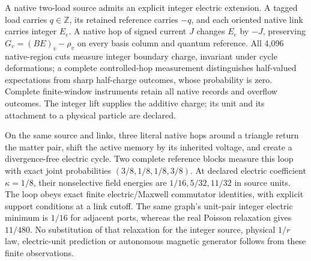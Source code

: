 A native two-load source admits an explicit integer electric extension.
A tagged load carries $q\in\mathbb Z$, its retained reference carries $-q$,
and each oriented native link carries integer $E_e$. A native hop of signed
current $J$ changes $E_e$ by $-J$, preserving
$G_v=(BE)_v-\rho_v$ on every basis column and quantum reference. All 4,096 native-region cuts measure integer boundary
charge, invariant under cycle deformations; a complete controlled-hop
measurement distinguishes half-valued expectations from sharp half-charge
outcomes, whose probability is zero. Complete
finite-window instruments retain all native records and overflow outcomes.
The integer lift supplies the additive charge; its unit and its attachment
to a physical particle are declared.

On the same source and links, three literal native hops around a triangle
return the matter pair, shift the active memory by its inherited voltage,
and create a divergence-free electric cycle. Two complete reference blocks
measure this loop with exact joint probabilities
$(3/8,1/8,1/8,3/8)$. At declared electric coefficient $\kappa=1/8$, their
nonselective field energies are $1/16,5/32,11/32$ in source units. The loop
obeys exact finite electric/Maxwell commutator identities, with explicit
support conditions at a link cutoff. The same graph's unit-pair integer
electric minimum is $1/16$ for adjacent ports, whereas the real Poisson
relaxation gives $11/480$. No substitution of that relaxation for the integer
source, physical $1/r$ law, electric-unit prediction or autonomous magnetic
generator follows from these finite observations.
